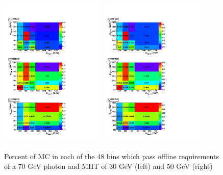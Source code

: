  \begin{figure}[!ht]
  \centering
 \includegraphics[width=0.45\textwidth]{figures/Photon70MHT30noPU.pdf}
 \includegraphics[width=0.45\textwidth]{figures/Photon70MHT50noPU.pdf}

\caption{Percent of MC in each of the 48 bins which pass offline requirements of a 70 GeV photon
and MHT of 30 GeV (left) and 50 GeV (right)}
\label{fig:phomhttrigs}
\end{figure}

